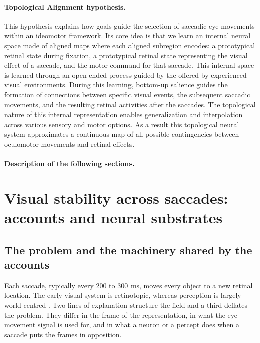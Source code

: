 \documentclass[14pt]{article}
\begin{document}
 
\paragraph{Topological Alignment hypothesis.} This hypothesis explains how goals guide the selection of saccadic eye movements within an ideomotor framework.
Its core idea is that we learn an internal neural space made of aligned maps where each aligned subregion encodes: a prototypical retinal state during fixation, a prototypical retinal state representing the visual effect of a saccade, and the motor command for that saccade.
This internal space is learned through an open-ended process guided by the  offered by experienced visual environments.
During this learning, bottom-up salience guides the formation of connections between specific visual events, the subsequent saccadic movements, and the resulting retinal activities after the saccades.
The topological nature of this internal representation enables generalization and interpolation across various sensory and motor options.
As a result this topological neural system approximates a continuous map of all possible contingencies between oculomotor movements and retinal effects.



\paragraph{Description of the following sections.}


\section{Visual stability across saccades: accounts and neural substrates}
\label{sec:substrates}

\subsection{The problem and the machinery shared by the accounts}

Each saccade, typically every 200 to 300 ms, moves every object to a new retinal location.
The early visual system is retinotopic, whereas perception is largely world-centred \citep{fabiusTimeCourseSpatiotopic2019,fairhallSpatiotopicUpdatingSaccades2017}.
Two lines of explanation structure the field and a third deflates the problem.
They differ in the frame of the representation, in what the eye-movement signal is used for, and in what a neuron or a percept does when a saccade puts the frames in opposition.
\end{document}

